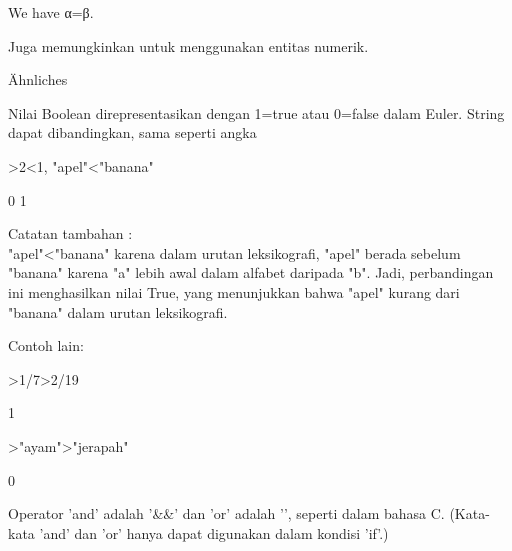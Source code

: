 \documentclass[a4paper,10pt]{article}
\begin{document}
\begin{eulernotebook}
\begin{euleroutput}
  We have α=β.
\end{euleroutput}
\begin{eulercomment}
Juga memungkinkan untuk menggunakan entitas numerik.
\end{eulercomment}
\begin{euleroutput}
  Ähnliches
\end{euleroutput}
\begin{eulercomment}
Nilai Boolean direpresentasikan dengan 1=true atau 0=false dalam
Euler. String dapat dibandingkan, sama seperti angka
\end{eulercomment}
\begin{eulerprompt}
>2<1, "apel"<"banana"
\end{eulerprompt}
\begin{euleroutput}
  0
  1
\end{euleroutput}
\begin{eulercomment}
Catatan tambahan :\\
"apel"\textless{}"banana" karena dalam urutan leksikografi, "apel" berada
sebelum "banana" karena "a" lebih awal dalam alfabet daripada "b".
Jadi, perbandingan ini menghasilkan nilai True, yang menunjukkan bahwa
"apel" kurang dari "banana" dalam urutan leksikografi.

Contoh lain:
\end{eulercomment}
\begin{eulerprompt}
>1/7>2/19
\end{eulerprompt}
\begin{euleroutput}
  1
\end{euleroutput}
\begin{eulerprompt}
>"ayam">"jerapah"
\end{eulerprompt}
\begin{euleroutput}
  0
\end{euleroutput}
\begin{eulercomment}
Operator 'and' adalah '\&\&' dan 'or' adalah '\textbar{}\textbar{}', seperti dalam bahasa
C. (Kata-kata 'and' dan 'or' hanya dapat digunakan dalam kondisi
'if'.)


\end{eulercomment}
\end{eulernotebook}
\end{document}
